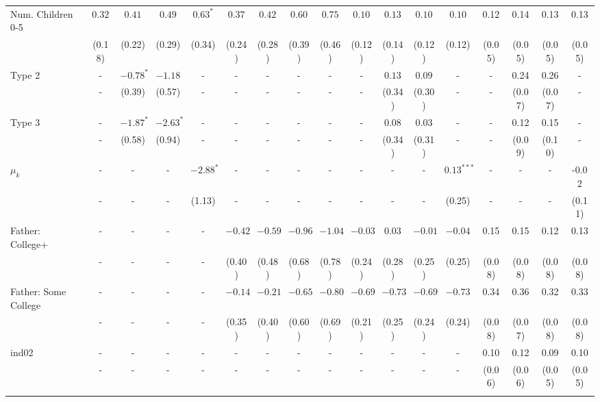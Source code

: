 \begin{tabular}{lcccccccccccccccc}
Num. Children 0-5&$0.32$&$0.41$&$0.49$&$0.63^{*}$&$0.37$&$0.42$&$0.60$&$0.75$&$0.10$&$0.13$&$0.10$&$0.10$&0.12&0.14&0.13&0.13\\
&(0.18)&(0.22)&(0.29)&(0.34)&(0.24)&(0.28)&(0.39)&(0.46)&(0.12)&(0.14)&(0.12)&(0.12)&(0.05)&(0.05)&(0.05)&(0.05)\\
Type 2&-&$-0.78^{*}$&$-1.18$&-&-&-&-&-&-&$0.13$&$0.09$&-&-&0.24&0.26&-\\
&-&(0.39)&(0.57)&-&-&-&-&-&-&(0.34)&(0.30)&-&-&(0.07)&(0.07)&-\\
Type 3&-&$-1.87^{*}$&$-2.63^{*}$&-&-&-&-&-&-&$0.08$&$0.03$&-&-&0.12&0.15&-\\
&-&(0.58)&(0.94)&-&-&-&-&-&-&(0.34)&(0.31)&-&-&(0.09)&(0.10)&-\\
$\mu_{k}$&-&-&-&$-2.88^{*}$&-&-&-&-&-&-&-&$0.13^{***}$&-&-&-&-0.02\\
&-&-&-&(1.13)&-&-&-&-&-&-&-&(0.25)&-&-&-&(0.11)\\
Father: College+&-&-&-&-&$-0.42$&$-0.59$&$-0.96$&$-1.04$&$-0.03$&$0.03$&$-0.01$&$-0.04$&0.15&0.15&0.12&0.13\\
&-&-&-&-&(0.40)&(0.48)&(0.68)&(0.78)&(0.24)&(0.28)&(0.25)&(0.25)&(0.08)&(0.08)&(0.08)&(0.08)\\
Father: Some College&-&-&-&-&$-0.14$&$-0.21$&$-0.65$&$-0.80$&$-0.69$&$-0.73$&$-0.69$&$-0.73$&0.34&0.36&0.32&0.33\\
&-&-&-&-&(0.35)&(0.40)&(0.60)&(0.69)&(0.21)&(0.25)&(0.24)&(0.24)&(0.08)&(0.07)&(0.08)&(0.08)\\
ind02&-&-&-&-&-&-&-&-&-&-&-&-&0.10&0.12&0.09&0.10\\
&-&-&-&-&-&-&-&-&-&-&-&-&(0.06)&(0.06)&(0.05)&(0.05)\\
\\
\bottomrule\end{tabular}